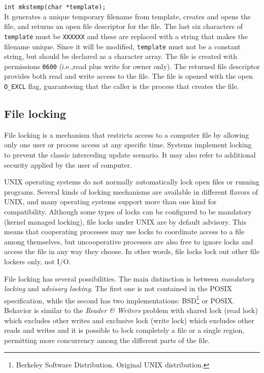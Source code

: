 \texttt{int mkstemp(char *template);}
\\
It generates a unique temporary filename from template, creates and opens the file, and returns an open file descriptor for the file. The last six characters of \texttt{template} must be \texttt{XXXXXX} and these are replaced with a string that makes the filename unique. Since it will be modified, \texttt{template} must not be a constant string, but should be declared as a character array. The file is created with permissions \texttt{0600} (i.e.,\@ read plus write for owner only). The returned file descriptor provides both read and write access to the file. The file is opened with the open \texttt{O\_EXCL} flag, guaranteeing that the caller is the process that creates the file.

\subsection{File locking}
File locking is a mechanism that restricts access to a computer file by allowing only one user or process access at any specific time. Systems implement locking to prevent the classic interceding update scenario. It may also refer to additional security applied by the user of computer.

UNIX operating systems do not normally automatically lock open files or running programs. Several kinds of locking mechanisms are available in different flavors of UNIX, and many operating systems support more than one kind for compatibility. Although some types of locks can be configured to be mandatory (kernel managed locking), file locks under UNIX are by default advisory. This means that cooperating processes may use locks to coordinate access to a file among themselves, but uncooperative processes are also free to ignore locks and access the file in any way they choose. In other words, file locks lock out other file lockers only, not I/O.

File locking has several possibilities. The main distinction is between \emph{mandatory locking} and \emph{advisory locking}. The first one is not contained in the POSIX specification, while the second has two implementations: BSD\footnote{Berkeley Software Distribution. Original UNIX distribution.} or POSIX. Behavior is similar to the \emph{Reader \& Writers} problem with shared lock (read lock) which excludes other writes and exclusive lock (write lock) which excludes other reads and writes and it is possible to lock completely a file or a single region, permitting more concurrency among the different parts of the file.

